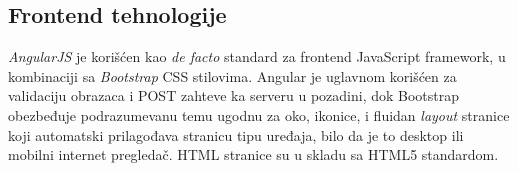 \subsection{Frontend tehnologije}

\emph{AngularJS}\cite{angularjs} je korišćen kao \textit{de facto} standard za frontend JavaScript framework, u kombinaciji sa \emph{Bootstrap}\cite{bootstrap} CSS stilovima. Angular je uglavnom korišćen za validaciju obrazaca i POST zahteve ka serveru u pozadini, dok Bootstrap obezbeđuje podrazumevanu temu ugodnu za oko, ikonice, i fluidan \textit{layout} stranice koji automatski prilagođava stranicu tipu uređaja, bilo da je to desktop ili mobilni internet pregledač. HTML stranice su u skladu sa HTML5 standardom.